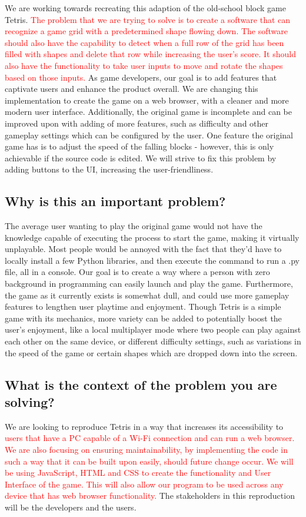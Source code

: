 \documentclass[11pt, oneside]{article}   	%
\begin{document}
\newcommand*\apos{\textsc{\char13}}
We are working towards recreating this adaption of the old-school block game Tetris. \textcolor{red}{The problem that we are trying to solve is to create a software that can recognize a game grid with a predetermined shape flowing down. The software should also have the capability to detect when a full row of the grid has been filled with shapes and delete that row while increasing the user's score. It should also have the functionality to take user inputs to move and rotate the shapes based on those inputs.} As game developers, our goal is to add features that captivate users and enhance the product overall. We are changing this implementation to create the game on a web browser, with a cleaner and more modern user interface. Additionally, the original game is incomplete and can be improved upon with adding of more features, such as difficulty and other gameplay settings which can be configured by the user. One feature the original game has is to adjust the speed of the falling blocks - however, this is only achievable if the source code is edited. We will strive to fix this problem by adding buttons to the UI, increasing the user-friendliness.
\subsection{Why is this an important problem?}

The average user wanting to play the original game would not have the knowledge capable of executing the process to start the game, making it virtually unplayable. Most people would be annoyed with the fact that they’d have to locally install a few Python libraries, and then execute the command to run a .py file, all in a console. Our goal is to create a way where a person with zero background in programming can easily launch and play the game. Furthermore, the game as it currently exists is somewhat dull, and could use more gameplay features to lengthen user playtime and enjoyment. Though Tetris is a simple game with its mechanics, more variety can be added to potentially boost the user’s enjoyment, like a local multiplayer mode where two people can play against each other on the same device, or different difficulty settings, such as variations in the speed of the game or certain shapes which are dropped down into the screen.

\subsection{What is the context of the problem you are solving?}

We are looking to reproduce Tetris in a way that increases its accessibility to \textcolor{red}{users that have a PC capable of a Wi-Fi connection and can run a web browser. We are also focusing on ensuring maintainability, by implementing the code in such a way that it can be built upon easily, should future change occur. We will be using JavaScript, HTML and CSS to create the functionality and User Interface of the game. This will also allow our program to be used across any device that has web browser functionality.} The stakeholders in this reproduction will be the developers and the users. 
\end{document}
